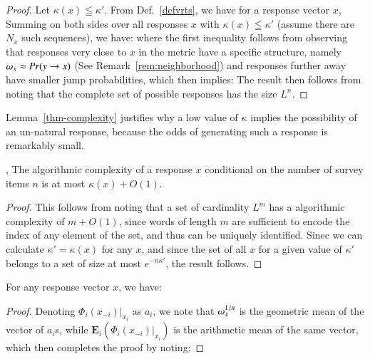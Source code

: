 \documentclass[onecolumn,10pt]{IEEEtran}
\begin{document}
\begin{proof} Let $\kappa(x) \leqq \kappa'$. From Def.~\ref{defvrts},   we have for a response vector $x$, 
  Summing on both sides over all responses $x $ with $\kappa(x)\leqq \kappa'$ (assume there are $N_x$ such sequences), we have:
  where the first inequality follows from observing that responses very close to $x$ in the \qdist metric have a specific structure, namely $\omega_{x} \approx Pr(y \rightarrow x)$ (See Remark~\ref{rem:neighborhood}) and responses further away have smaller jump probabilities, which then  implies:
  The result then follows from noting that the complete set of possible responses has the size $L^n$.
\end{proof}
% 
Lemma~\ref{thm-complexity} justifies why a low value of $\kappa$ implies the possibility of an un-natural response, because the odds of generating such a response is remarkably small.
%
\begin{cor}
, The algorithmic complexity of a response $x$ conditional on the number of survey items $n$ is at most  $\kappa(x) + O(1) $.
\end{cor}
\begin{proof}
This follows from noting that a set of cardinality $L^m$ has a algorithmic complexity of $m + O(1)$, since words of length $m$ are sufficient to encode the index of any element of the set, and thus can be uniquely identified. Sinec we can calculate $\kappa'=\kappa(x)$ for any $x$, and since the set of all $x$ for a given value of $\kappa'$ belongs to a set of size at most $e^{ -n \kappa' }$, the result follows.
\end{proof}

\begin{lem}[Surprise]\label{thm-xtalk}
  For any response vector $x$, we have:
\end{lem}
% 
\begin{proof}
  Denoting $\Phi_i (x_{-i}) \vert_{x_i}$ as $a_i$, we note that $\omega_{x}^{1/n} $ is the geometric mean of the vector of $a_i$s, while $\mathbf{E}_i \left (   \Phi_i (x_{-i}) \vert_{x_i}   \right )$ is the arithmetic mean of the same vector, which then completes the proof by noting:
\end{proof}
% 
\end{document}
